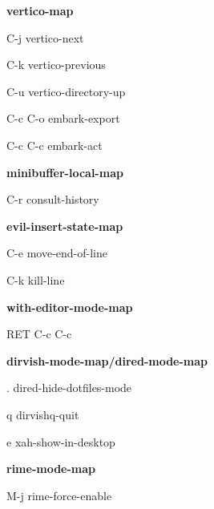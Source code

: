 \documentclass[10pt]{article}
\renewcommand\subsection[1]{\smallskip\par\textbf{\color{heading}#1}}
\begin{document}
\begin{multicols}{4}
  \subsection{vertico-map}
  \begin{keylist}
    \item[C-j] vertico-next
    \item[C-k] vertico-previous
    \item[C-u] vertico-directory-up
    \item[C-c C-o] embark-export
    \item[C-c C-c] embark-act
  \end{keylist}
  \subsection{minibuffer-local-map}
  \begin{keylist}
    \item[C-r] consult-history
  \end{keylist}
  \subsection{evil-insert-state-map}
  \begin{keylist}
    \item[C-e] move-end-of-line
    \item[C-k] kill-line
  \end{keylist}
  \subsection{with-editor-mode-map}
  \begin{keylist}
    \item[RET] C-c C-c
  \end{keylist}

  \subsection{dirvish-mode-map/dired-mode-map}
  \begin{keylist}
    \item[.] dired-hide-dotfiles-mode
    \item[q] dirvishq-quit
    \item[e] xah-show-in-desktop
  \end{keylist}

  \subsection{rime-mode-map}
  \begin{keylist}
    \item[M-j] rime-force-enable
  \end{keylist}


\end{multicols}
\end{document}
